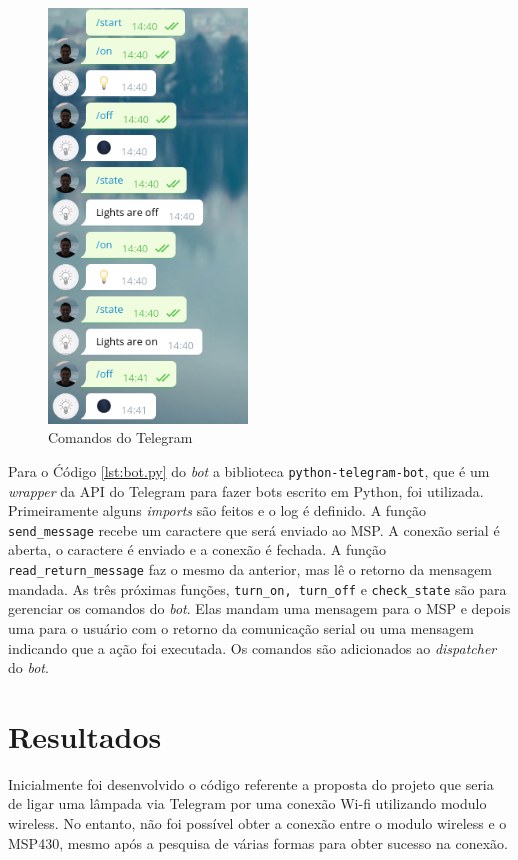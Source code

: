 \documentclass[12pt,journal,compsoc]{IEEEtran}
\begin{document}
\begin{figure}[h!]
\centering
\includegraphics[width=200px,height=\textheight,keepaspectratio]{telegram_commands}
\caption{Comandos do Telegram}
\label{fig:telegram}
\end{figure}

Para o Ćódigo \ref{lst:bot.py} do \textit{bot} a biblioteca \texttt{python-telegram-bot}, que é um \textit{wrapper} da API do Telegram para fazer bots escrito em Python, foi utilizada. Primeiramente alguns \textit{imports} são feitos e o log é definido. A função \texttt{send\_message} recebe um caractere que será enviado ao MSP. A conexão serial é aberta, o caractere é enviado e a conexão é fechada. A função \texttt{read\_return\_message} faz o mesmo da anterior, mas lê o retorno da mensagem mandada. As três próximas funções, \texttt{turn\_on, turn\_off} e \texttt{check\_state} são para gerenciar os comandos do \textit{bot}. Elas mandam uma mensagem para o MSP e depois uma para o usuário com o retorno da comunicação serial ou uma mensagem indicando que a ação foi executada. Os comandos são adicionados ao \textit{dispatcher} do \textit{bot}.


\section{Resultados}

Inicialmente foi desenvolvido o código referente a proposta do projeto que seria de ligar uma lâmpada via Telegram por uma conexão Wi-fi utilizando modulo wireless. No entanto, não foi possível obter a conexão entre o modulo wireless e o MSP430, mesmo após a pesquisa de várias formas para obter sucesso na conexão.
\end{document}
